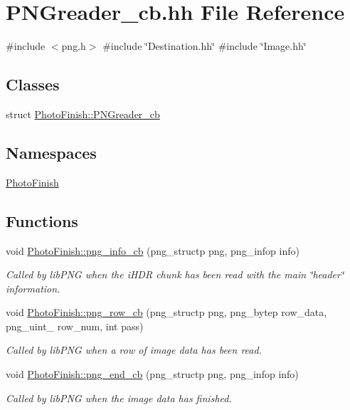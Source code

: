 \hypertarget{_p_n_greader__cb_8hh}{}\section{P\+N\+Greader\+\_\+cb.\+hh File Reference}
\label{_p_n_greader__cb_8hh}
{\ttfamily \#include $<$png.\+h$>$}\newline
{\ttfamily \#include \char`\"{}Destination.\+hh\char`\"{}}\newline
{\ttfamily \#include \char`\"{}Image.\+hh\char`\"{}}\newline
\subsection*{Classes}
\begin{DoxyCompactItemize}
\item 
struct \hyperlink{struct_photo_finish_1_1_p_n_greader__cb}{Photo\+Finish\+::\+P\+N\+Greader\+\_\+cb}
\end{DoxyCompactItemize}
\subsection*{Namespaces}
\begin{DoxyCompactItemize}
\item 
 \hyperlink{namespace_photo_finish}{Photo\+Finish}
\end{DoxyCompactItemize}
\subsection*{Functions}
\begin{DoxyCompactItemize}
\item 
void \hyperlink{namespace_photo_finish_abbdfd629905a885c93d81cd53d3caca2}{Photo\+Finish\+::png\+\_\+info\+\_\+cb} (png\+\_\+structp png, png\+\_\+infop info)
\begin{DoxyCompactList}\small\item\em Called by lib\+P\+NG when the i\+H\+DR chunk has been read with the main \char`\"{}header\char`\"{} information. \end{DoxyCompactList}\item 
void \hyperlink{namespace_photo_finish_a406711757cc8db01c66461573c1154f0}{Photo\+Finish\+::png\+\_\+row\+\_\+cb} (png\+\_\+structp png, png\+\_\+bytep row\+\_\+data, png\+\_\+uint\+\_ row\+\_\+num, int pass)
\begin{DoxyCompactList}\small\item\em Called by lib\+P\+NG when a row of image data has been read. \end{DoxyCompactList}\item 
void \hyperlink{namespace_photo_finish_a3ccb46c945cf009874ba8dbc24d15ac6}{Photo\+Finish\+::png\+\_\+end\+\_\+cb} (png\+\_\+structp png, png\+\_\+infop info)
\begin{DoxyCompactList}\small\item\em Called by lib\+P\+NG when the image data has finished. \end{DoxyCompactList}\end{DoxyCompactItemize}
